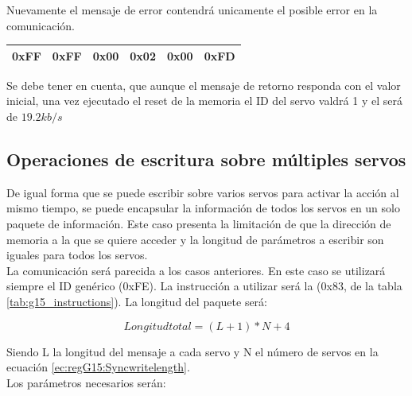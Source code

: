 		 Nuevamente el mensaje de error contendrá unicamente el posible error en la comunicación.
		 \begin{center}
		 	\begin{tabular}{|c|c|c|c|c|c|}
		 		\hline
		 		0xFF & 0xFF & 0x00 & 0x02 & 0x00 & 0xFD \\
		 		\hline
		 	\end{tabular}
		 \end{center}

		 Se debe tener en cuenta, que aunque el mensaje de retorno responda con el valor inicial, una vez ejecutado el reset de la memoria el ID del servo valdrá 1 y el  será de $19.2kb/s$

	\subsection{Operaciones de escritura sobre múltiples servos}
		De igual forma que se puede escribir sobre varios servos para activar la acción al mismo tiempo, se puede encapsular la información de todos los servos en un solo paquete de información. Este caso presenta la limitación de que la dirección de memoria a la que se quiere acceder y la longitud de parámetros a escribir son iguales para todos los servos.
		\\

		La comunicación será parecida a los casos anteriores. En este caso se utilizará siempre el ID genérico (0xFE). La instrucción a utilizar será la  (0x83, de la tabla \ref{tab:g15_instructions}). La longitud del paquete será:

		\begin{equation}
		\label{ec:regG15:Syncwritelength}
			Longitud total = (L+1) * N + 4
		\end{equation}

		Siendo L la longitud del mensaje a cada servo y N el número de servos en la ecuación \ref{ec:regG15:Syncwritelength}.
		\\

		Los parámetros necesarios serán:
		\\

